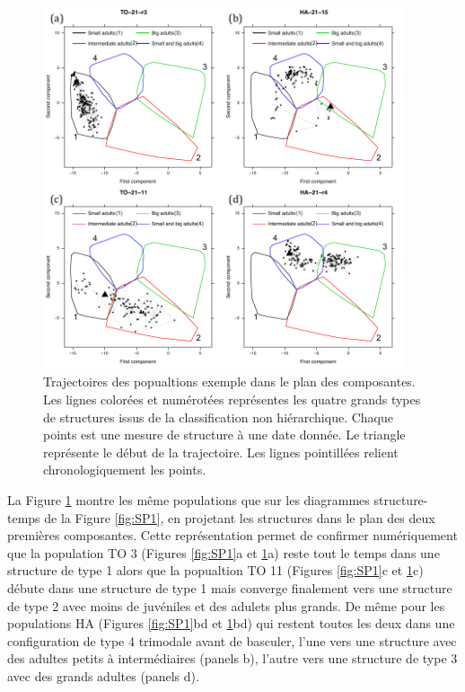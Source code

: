 \begin{figure}[!ht]
\begin{center}
\includegraphics[width=0.95\textwidth]{1_CorpsDeThese/Resumes/Fig/SP04}
\caption[Trajectoires des
popualtions exemple dans le plan des composantes]{Trajectoires des
popualtions exemple dans le plan des composantes. Les lignes colorées et
numérotées représentes les quatre grands types de structures issus de la
classification non hiérarchique. Chaque points est une mesure de structure à
une date donnée. Le triangle représente le début de la trajectoire. Les lignes
pointillées relient chronologiquement les points.}
\label{fig:SP4}
\end{center}
\end{figure}

La Figure \ref{fig:SP4} montre les même populations que sur les diagrammes
structure-temps de la Figure \ref{fig:SP1}, en projetant les structures dans le
plan des deux premières composantes. Cette représentation permet de confirmer
numériquement que la population TO 3 (Figures \ref{fig:SP1}a et \ref{fig:SP4}a)
reste tout le temps dans une structure de type 1 alors que la popualtion TO 11 
(Figures \ref{fig:SP1}c et \ref{fig:SP4}c) débute dans une structure de type 1 mais converge finalement vers une structure
de type 2 avec moins de juvéniles et des adulets plus grands. De même pour les
populations HA  (Figures \ref{fig:SP1}bd et \ref{fig:SP4}bd) qui restent 
toutes les deux dans une configuration de type 4 trimodale avant de basculer,
l'une vers une structure avec des adultes petits à intermédiaires (panels b),
l'autre vers une structure de type 3 avec des grands adultes (panels d). 

